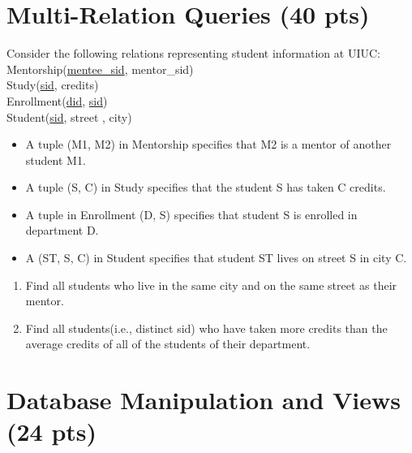 \documentclass[paper=a4, fontsize=11pt]{scrartcl}
\numberwithin{equation}{section}		%
\numberwithin{figure}{section}			%
\numberwithin{table}{section}				%
\begin{document}
	\newpage
	
	\section{Multi-Relation Queries (40 pts)}
	Consider the following relations representing student information at UIUC:\\
	Mentorship(\underline{mentee\_sid}, mentor\_sid)\\
	Study(\underline{sid}, credits)\\
	Enrollment(\underline{did}, \underline{sid})\\
	Student(\underline{sid}, street , city)
	
	\begin{itemize}
		\item A tuple (M1, M2) in Mentorship specifies that M2 is a mentor of another student M1. 
		\item A tuple (S, C) in Study specifies that the student S has taken C credits.
		\item A tuple in Enrollment (D, S) specifies that student S is enrolled in department D. 
		\item A (ST, S, C) in Student specifies that student ST lives on street S in city C.
	\end{itemize}
	
	\begin{enumerate}
	
		\item Find all students who live in the same city and on the same street as their mentor.\\
		
		\item Find all students(i.e., distinct sid) who have taken more credits than the average credits of all of the students of their department.\\
		
	\end{enumerate}
	
	\newpage
	
	\section{Database Manipulation and Views (24 pts)}
	
\end{document}
